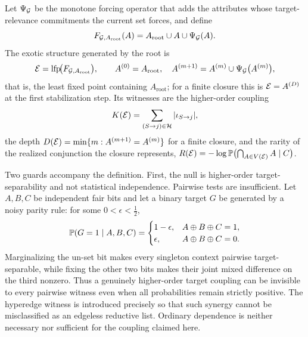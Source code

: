\begin{definition}
Let $\Psi_{\mathcal{G}}$ be the monotone forcing operator that adds the
attributes whose target-relevance commitments the current set forces,
and define
\[
F_{\mathcal{G},A_{\mathrm{root}}}(A)
=A_{\mathrm{root}}\cup A\cup\Psi_{\mathcal{G}}(A).
\]
The exotic structure generated by the root is
\[
\mathcal{E}=\operatorname{lfp}\!\bigl(F_{\mathcal{G},A_{\mathrm{root}}}\bigr),
\qquad
A^{(0)}=A_{\mathrm{root}},\quad
A^{(m+1)}=A^{(m)}\cup\Psi_{\mathcal{G}}\bigl(A^{(m)}\bigr),
\]
that is, the least fixed point containing $A_{\mathrm{root}}$; for a
finite closure this is $\mathcal{E}=A^{(D)}$ at the first stabilization step.
Its witnesses are the higher-order coupling
\[
K(\mathcal{E})=\sum_{(S\to j)\in\mathcal H}|\iota_{S\to j}|,
\]
the depth
$D(\mathcal{E})=\min\{m:A^{(m+1)}=A^{(m)}\}$ for a finite closure, and the
rarity of the realized conjunction the closure represents,
$R(\mathcal{E})=-\log\mathbb{P}\bigl(\bigcap_{A\in V(\mathcal{E})}A\mid C\bigr)$.
\end{definition}

\noindent Two guards accompany the definition. First, the null is
higher-order target-separability and not statistical independence.
Pairwise tests are insufficient. Let $A,B,C$ be independent fair
bits and let a binary target $G$ be generated by a noisy parity rule:
for some $0<\epsilon<\tfrac12$,
\[
\mathbb{P}(G=1\mid A,B,C)=
\begin{cases}
1-\epsilon,&A\oplus B\oplus C=1,\\
\epsilon,&A\oplus B\oplus C=0.
\end{cases}
\]
Marginalizing the un-set bit makes every singleton context
pairwise target-separable, while fixing the other two bits makes their
joint mixed difference on the third nonzero. Thus a genuinely
higher-order target coupling can be invisible to every pairwise witness
even when all probabilities remain strictly positive. The hyperedge
witness is introduced precisely so that such synergy cannot be
misclassified as an edgeless reductive list. Ordinary dependence is
neither necessary nor sufficient for the coupling claimed here.

